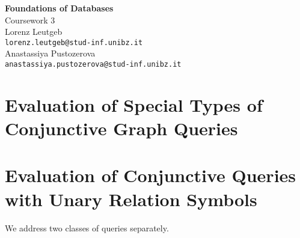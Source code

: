 \documentclass[a4paper,12pt]{article}
\begin{document}
\begin{center}
{\LARGE\bfseries Foundations of Databases}\\[3mm]

{\Large Coursework 3}\\[5mm]

Lorenz Leutgeb\\\texttt{lorenz.leutgeb@stud-inf.unibz.it}\\[2mm]
Anastassiya Pustozerova\\\texttt{anastassiya.pustozerova@stud-inf.unibz.it}
\end{center}

\section{Evaluation of Special Types of Conjunctive Graph Queries}

\section{Evaluation of Conjunctive Queries with Unary Relation Symbols}

We address two classes of queries separately.
\end{document}
